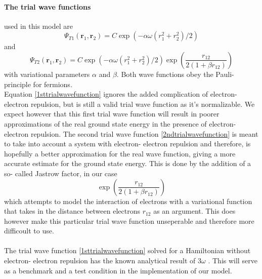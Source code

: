 \documentclass[10pt,a4paper]{article}
\begin{document}
\paragraph{The trial wave functions} used in this model are \begin{equation}\label{1sttrialwavefunction}
\Psi_{T1}(\mathbf{r}_1,\mathbf{r}_2) = C\exp{\left(-\alpha\omega(r_1^2+r_2^2)/2\right)}
\end{equation}
and
\begin{equation}\label{2ndtrialwavefunction}
\Psi_{T2}(\mathbf{r}_1,\mathbf{r}_2) =
    C\exp{\left(-\alpha\omega(r_1^2+r_2^2)/2\right)}
    \exp{\left(\frac{r_{12}}{2(1+\beta r_{12})}\right)}
\end{equation}
with variational parameters $\alpha$ and $\beta$. Both wave functions obey the Pauli- principle for fermions.\\Equation \eqref{1sttrialwavefunction} ignores the added complication of electron- electron repulsion, but is still a valid trial wave function as it's normalizable. We expect however that this first trial wave function will result in poorer approximations of the real ground state energy in the presence of electron- electron repulsion. The second trial wave function \eqref{2ndtrialwavefunction} is meant to take into account a system with electron- electron repulsion and therefore, is hopefully a better approximation for the real wave function, giving a more accurate estimate for the ground state energy. This is done by the addition of a so- called Jastrow factor, in our case 
\begin{equation}\label{jastrow}
\exp{\left(\frac{r_{12}}{2(1+\beta r_{12})}\right)}
\end{equation}
which attempts to model the interaction of electrons with a variational function that takes in the distance between electrons $r_{12}$ as an argument. This does however make this particular trial wave function unseperable and therefore more difficoult to use.\\\\The trial wave function \eqref{1sttrialwavefunction} solved for a Hamiltonian without electron- electron repulsion has the known analytical result of $3\omega$ \cite{Problem_set_5}. This will serve as a benchmark and a test condition in the implementation of our model.
\end{document}
